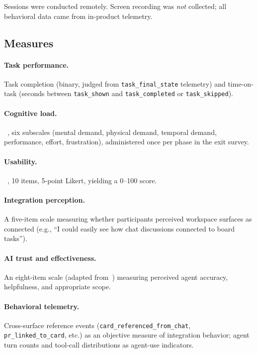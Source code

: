 Sessions were conducted remotely. Screen recording was \emph{not} collected;
all behavioral data came from in-product telemetry.

\subsection{Measures}
\label{sec:study:measures}

\paragraph{Task performance.}
Task completion (binary, judged from \texttt{task\_final\_state} telemetry) and
time-on-task (seconds between \texttt{task\_shown} and \texttt{task\_completed}
or \texttt{task\_skipped}).

\paragraph{Cognitive load.}
\NASATLX~\cite{hart1988tlx}, six subscales (mental demand, physical demand,
temporal demand, performance, effort, frustration), administered once per phase
in the exit survey.

\paragraph{Usability.}
\SUS~\cite{brooke1996sus}, 10 items, 5-point Likert, yielding a 0--100 score.

\paragraph{Integration perception.}
A five-item scale measuring whether participants perceived workspace surfaces as
connected (e.g., ``I could easily see how chat discussions connected to board
tasks'').

\paragraph{AI trust and effectiveness.}
An eight-item scale (adapted from~\cite{madsen2000measuring}) measuring perceived
agent accuracy, helpfulness, and appropriate scope.

\paragraph{Behavioral telemetry.}
Cross-surface reference events (\texttt{card\_referenced\_from\_chat},
\texttt{pr\_linked\_to\_card}, etc.) as an objective measure of integration
behavior; agent turn counts and tool-call distributions as agent-use indicators.
